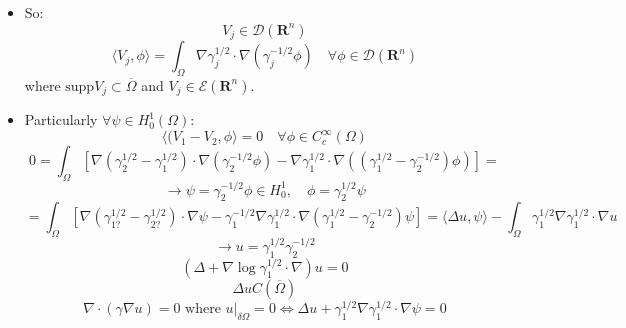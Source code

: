 \documentclass{article}
\begin{document}
\begin{itemize}
    \item So:
    \begin{equation}
        V_j \in \mathcal{D}(\mathbf{R}^n)
    \end{equation}
    \begin{equation}
        \langle V_j , \phi \rangle = \int_\Omega \nabla \gamma^{1/2}_j \cdot \nabla (\gamma^{-1/2}_j \phi) \quad \forall \phi \in \mathcal{D}(\mathbf{R}^n)
    \end{equation}
    where $\text{supp} V_j \subset \overline{\Omega}$ and $V_j \in \mathcal{E}(\mathbf{R}^n)$.

    \item Particularly $\forall \psi \in H_0^1(\Omega)$:
    \begin{equation}
        \langle (V_1 - V_2, \phi \rangle = 0 \quad \forall \phi \in C_c^\infty (\Omega)
    \end{equation}
    \begin{equation}
        0 = \int_\Omega [\nabla (\gamma^{1/2}_2 - \gamma^{1/2}_1) \cdot \nabla (\gamma^{-1/2}_2 \phi) - \nabla \gamma^{1/2}_1 \cdot \nabla ((\gamma^{1/2}_1 - \gamma^{-1/2}_2) \phi)] =
    \end{equation}
    \begin{equation}
        \rightarrow \psi = \gamma^{-1/2}_2 \phi \in H_0^1, \quad \phi = \gamma^{1/2}_2 \psi
    \end{equation}
    \begin{equation}
        = \int_\Omega [\nabla (\gamma^{1/2}_{1?} - \gamma^{1/2}_{2?}) \cdot \nabla \psi - \gamma^{-1/2}_{1} \nabla \gamma^{1/2}_1 \cdot  \nabla (\gamma^{1/2}_1 - \gamma^{-1/2}_2)\psi] = \langle \Delta u, \psi \rangle - \int_\Omega \gamma^{1/2}_1 \nabla \gamma^{1/2}_{1} \cdot \nabla u  
    \end{equation}
    \begin{equation}
        \rightarrow u = \gamma^{1/2}_1 \gamma^{-1/2}_2
    \end{equation}
    \begin{equation}
        \boxed{(\Delta + \nabla \log \gamma^{1/2}_1 \cdot \nabla ) u = 0}
    \end{equation}
    \begin{equation}
        \Delta u C(\overline{\Omega})
    \end{equation}
    \begin{equation}
        \nabla \cdot (\gamma \nabla u) = 0 \text{ where } u|_{\delta \Omega} = 0 \iff \Delta u + \gamma^{1/2}_1 \nabla \gamma^{1/2}_1 \cdot \nabla\psi = 0 
    \end{equation}


\end{itemize}
\end{document}
